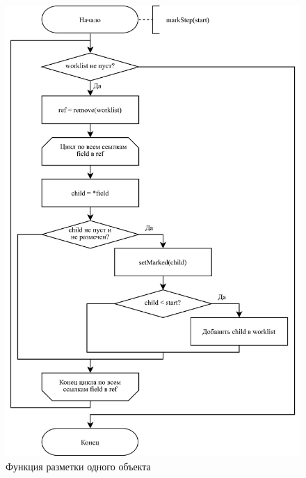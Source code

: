 \begin{figure}[H]
	\centering
	\includegraphics[scale=0.175]{assets/mark-sweep-2.png}
	\caption{Функция разметки одного объекта}
	\label{fig:mark-sweep-2}
\end{figure}

